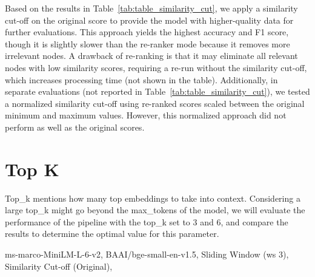 Based on the results in Table~\ref{tab:table_similarity_cut}, we apply a similarity cut-off on the original score to provide the model with higher-quality data for further evaluations.
This approach yields the highest accuracy and F1 score, though it is slightly slower than the re-ranker mode because it removes more irrelevant nodes.
A drawback of re-ranking is that it may eliminate all relevant nodes with low similarity scores, requiring a re-run without the similarity cut-off, which increases processing time (not shown in the table).
Additionally, in separate evaluations (not reported in Table~\ref{tab:table_similarity_cut}), we tested a normalized similarity cut-off using re-ranked scores scaled between the original minimum and maximum values.
However, this normalized approach did not perform as well as the original scores.
\section{Top K}\label{sec:top-k}
Top\_k mentions how many top embeddings to take into context.
Considering a large top\_k might go beyond the max\_tokens of the model, we will evaluate the performance of the pipeline with the top\_k set to 3 and 6, and compare the results to determine the optimal value for this parameter.
\begin{table}[h!]
    \centering
    \noindent
    {\scriptsize ms-marco-MiniLM-L-6-v2, BAAI/bge-small-en-v1.5, Sliding Window (ws 3), Similarity Cut-off (Original),}
    \caption{Evaluation Results for Different Top\_k through the Pipeline (just with the Gemma2 model)}
    \label{tab:table_top_k}
\end{table}

